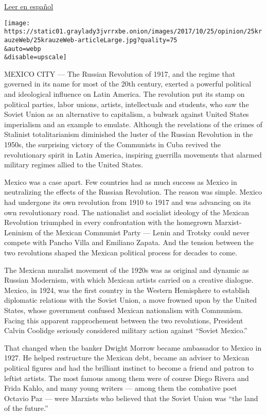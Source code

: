 \href{https://www.nytimes3xbfgragh.onion/es/2017/10/17/la-revolucion-domesticada}{Leer
en español}

\texttt{[image: https://static01.graylady3jvrrxbe.onion/images/2017/10/25/opinion/25krauzeWeb/25krauzeWeb-articleLarge.jpg?quality=75\\\&auto=webp\\\&disable=upscale]}

MEXICO CITY --- The Russian Revolution of 1917, and the regime that
governed in its name for most of the 20th century, exerted a powerful
political and ideological influence on Latin America. The revolution put
its stamp on political parties, labor unions, artists, intellectuals and
students, who saw the Soviet Union as an alternative to capitalism, a
bulwark against United States imperialism and an example to emulate.
Although the revelations of the crimes of Stalinist totalitarianism
diminished the luster of the Russian Revolution in the 1950s, the
surprising victory of the Communists in Cuba revived the revolutionary
spirit in Latin America, inspiring guerrilla movements that alarmed
military regimes allied to the United States.

Mexico was a case apart. Few countries had as much success as Mexico in
neutralizing the effects of the Russian Revolution. The reason was
simple. Mexico had undergone its own revolution from 1910 to 1917 and
was advancing on its own revolutionary road. The nationalist and
socialist ideology of the Mexican Revolution triumphed in every
confrontation with the homegrown Marxist-Leninism of the Mexican
Communist Party --- Lenin and Trotsky could never compete with Pancho
Villa and Emiliano Zapata. And the tension between the two revolutions
shaped the Mexican political process for decades to come.

The Mexican muralist movement of the 1920s was as original and dynamic
as Russian Modernism, with which Mexican artists carried on a creative
dialogue. Mexico, in 1924, was the first country in the Western
Hemisphere to establish diplomatic relations with the Soviet Union, a
move frowned upon by the United States, whose government confused
Mexican nationalism with Communism. Facing this apparent rapprochement
between the two revolutions, President Calvin Coolidge seriously
considered military action against ``Soviet Mexico.''

That changed when the banker Dwight Morrow became ambassador to Mexico
in 1927. He helped restructure the Mexican debt, became an adviser to
Mexican political figures and had the brilliant instinct to become a
friend and patron to leftist artists. The most famous among them were of
course Diego Rivera and Frida Kahlo, and many young writers --- among
them the combative poet Octavio Paz --- were Marxists who believed that
the Soviet Union was ``the land of the future.''

